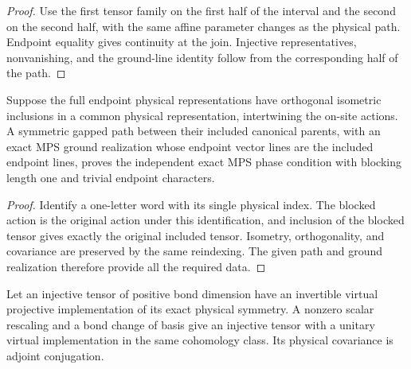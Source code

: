\begin{proof}\leanok
    Use the first tensor family on the first half of the interval and
    the second on the second half, with the same affine parameter changes
    as the physical path. Endpoint equality gives continuity at the join.
    Injective representatives, nonvanishing, and the ground-line identity
    follow from the corresponding half of the path.
\end{proof}

\begin{lemma}
    \label{thm:spt_exact_phase_one_site_path}
    \leanok
    Suppose the full endpoint physical representations have orthogonal
    isometric inclusions in a common physical representation, intertwining
    the on-site actions. A symmetric gapped path between their included
    canonical parents, with an exact MPS ground realization whose endpoint
    vector lines are the included endpoint lines, proves the independent
    exact MPS phase condition with blocking length one and trivial
    endpoint characters.
\end{lemma}

\begin{proof}\leanok
    Identify a one-letter word with its single physical index. The blocked
    action is the original action under this identification, and inclusion
    of the blocked tensor gives exactly the original included tensor.
    Isometry, orthogonality, and covariance are preserved by the same
    reindexing. The given path and ground realization therefore provide
    all the required data.
\end{proof}

\begin{lemma}
    \label{thm:spt_exact_phase_unitary_preparation}
    \leanok
    Let an injective tensor of positive bond dimension have an
    invertible virtual projective implementation of its exact physical
    symmetry. A nonzero scalar rescaling and a bond change of basis give
    an injective tensor with a unitary virtual implementation in the
    same cohomology class. Its physical covariance is adjoint conjugation.
\end{lemma}

